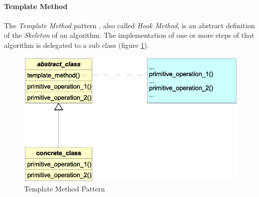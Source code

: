 %
%
%
%
%
%
%

\paragraph{Template Method}
\label{template_method_heading}

The \emph{Template Method} pattern \cite{gamma1995}, also called
\emph{Hook Method}, is an abstract definition of the \emph{Skeleton} of an
algorithm. The implementation of one or more steps of that algorithm is
delegated to a sub class (figure \ref{templatemethod_figure}).

\begin{figure}[ht]
    \begin{center}
        \includegraphics[scale=0.3]{vector/templatemethod.eps}
        \caption{Template Method Pattern}
        \label{templatemethod_figure}
    \end{center}
\end{figure}
